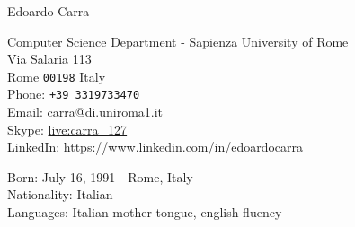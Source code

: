 \documentclass[11pt, a4paper]{article} %
\begin{document}


{\LARGE Edoardo Carra}\\[1cm] %

\vfill %

\vfill %

Computer Science Department - Sapienza University of Rome\\ %
Via Salaria 113\\
Rome \texttt{00198}
Italy\\[.2cm]
Phone: \texttt{+39 3319733470}\\ %
Email: \href{mailto:carra@di.uniroma1.it}{carra@di.uniroma1.it}\\ %
Skype: \href{https://join.skype.com/invite/gQN9qtZGLZ7r}{live:carra\_127}\\
LinkedIn: \href{https://www.linkedin.com/in/edoardocarra/}{https://www.linkedin.com/in/edoardocarra}\\ %

\vfill %


Born: July 16, 1991---Rome, Italy\\ %
Nationality: Italian\\ %
Languages: Italian mother tongue, english fluency\\
\end{document}
